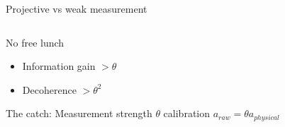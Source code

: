 \documentclass{beamer}
\begin{document}
\begin{frame}{Projective vs weak measurement}
\begin{columns}
		
		\end{columns}

	
		\begin{alertblock}{No free lunch}
			\begin{itemize}
				\item Information gain $>\theta$
				\item Decoherence $>\theta^2$
			\end{itemize}
		\end{alertblock}
	
	
		\begin{alertblock}{The catch: Measurement strength $\theta$ calibration}
			$a_{raw}=\theta a_{physical}$
		\end{alertblock}
	
	
	\end{frame}
\end{document}
